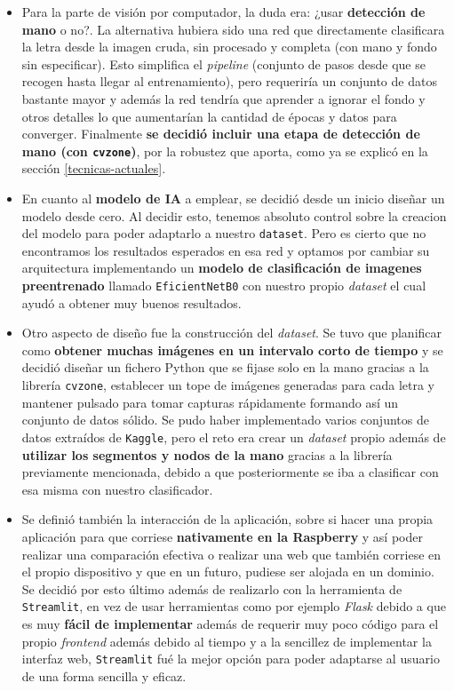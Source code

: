 \begin{itemize}
    \item Para la parte de visión por computador, la duda era: ¿usar \textbf{detección de mano} o no?.
    La alternativa hubiera sido una red que directamente clasificara la letra desde la imagen cruda, sin procesado y completa (con mano y fondo sin especificar). Esto simplifica el \textit{pipeline} (conjunto de pasos desde que se recogen hasta llegar al entrenamiento), pero requeriría un conjunto de datos bastante mayor y además la red tendría que aprender a ignorar el fondo y otros detalles lo que aumentarían la cantidad de épocas y datos para converger. Finalmente \textbf{se decidió incluir una etapa de detección de mano (con \texttt{cvzone})}, por la robustez que aporta, como ya se explicó en la sección \ref{tecnicas-actuales}. 

    \item En cuanto al \textbf{modelo de IA} a emplear, se decidió desde un inicio diseñar un modelo desde cero. Al decidir esto, tenemos absoluto control sobre la creacion del modelo para poder adaptarlo a nuestro \texttt{dataset}. Pero es cierto que no encontramos los resultados esperados en esa red y optamos por cambiar su arquitectura implementando un \textbf{modelo de clasificación de imagenes preentrenado} llamado \texttt{EficientNetB0} con nuestro propio \textit{dataset} el cual ayudó a obtener muy buenos resultados.

    \item Otro aspecto de diseño fue la construcción del \textit{dataset}. Se tuvo que planificar como \textbf{obtener muchas imágenes en un intervalo corto de tiempo} y se decidió diseñar un fichero Python que se fijase solo en la mano gracias a la librería \texttt{cvzone}, establecer un tope de imágenes generadas para cada letra y mantener pulsado para tomar capturas rápidamente formando así un conjunto de datos sólido. Se pudo haber implementado varios conjuntos de datos extraídos de \texttt{Kaggle}, pero el reto era crear un \textit{dataset} propio además de \textbf{utilizar los segmentos y nodos de la mano } gracias a la librería previamente mencionada, debido a que posteriormente se iba a clasificar con esa misma con nuestro clasificador.

    \item Se definió también la interacción de la aplicación, sobre si hacer una propia aplicación para que corriese \textbf{nativamente en la Raspberry} y así poder realizar una comparación efectiva o realizar una web que también corriese en el propio dispositivo y que en un futuro, pudiese ser alojada en un dominio. Se decidió por esto último además de realizarlo con la herramienta de \texttt{Streamlit}, en vez de usar herramientas como por ejemplo \textit{Flask} debido a que es muy \textbf{fácil de implementar} además de requerir muy poco código para el propio \textit{frontend} además debido al tiempo y a la sencillez de implementar la interfaz web, \texttt{Streamlit} fué la mejor opción para poder adaptarse al usuario de una forma sencilla y eficaz.


\end{itemize}
